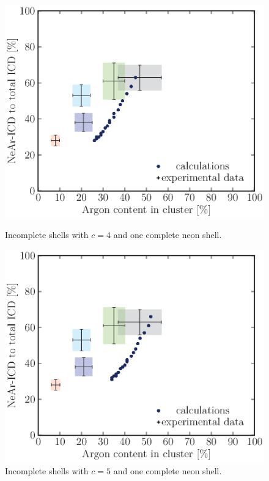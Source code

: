 \begin{figure}[!h]
\begin{minipage}{0.48\textwidth}
    \centering
    \includegraphics[scale=0.5]{pics/incompl01_04.ps}
    \caption{Incomplete shells with $c=4$ and one complete neon shell.}
    \label{incompl00_01}
\end{minipage}
\hfill
\begin{minipage}{0.48\textwidth}
    \centering
    \includegraphics[scale=0.5]{pics/incompl01_05.ps}
    \caption{Incomplete shells with $c=5$ and one complete neon shell.}
    \label{incompl01_05}
\end{minipage}
\end{figure}

